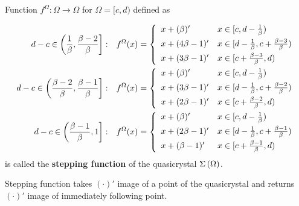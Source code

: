 \documentclass[text.tex]{subfiles}
\begin{document}
\begin{definition}
\label{def:steppingFunction}
Function $f^\Omega: \Omega \to \Omega$ for $\Omega = [c,d)$ defined as

\begin{align*}
d-c \in \left( \frac{1}{\beta}, \frac{\beta - 2}{\beta} \right]:& \quad
		f^\Omega(x) = \left\{ \begin{array}{l l}
			x + (\beta)' 	& x\in [c,d-\frac{1}{\beta})\\[1.5mm]
			x + (4\beta-1)' & x\in [d-\frac{1}{\beta},c+\frac{\beta - 3}{\beta})\\[1.5mm]
			x + (3\beta-1)' & x\in [c+\frac{\beta - 3}{\beta},d)
		\end{array} \right.
\\
d-c \in \left( \frac{\beta-2}{\beta}, \frac{\beta-1}{\beta} \right]:& \quad
		f^\Omega(x) = \left\{ \begin{array}{l l}
			x + (\beta)' 	& x\in [c,d-\frac{1}{\beta})\\[1.5mm]
			x + (3\beta-1)' & x\in [d-\frac{1}{\beta},c+\frac{\beta - 2}{\beta})\\[1.5mm]
			x + (2\beta-1)' & x\in [c+\frac{\beta - 2}{\beta},d)
		\end{array} \right.
\\
d-c \in \left( \frac{\beta-1}{\beta}, 1 \right]:& \quad
		f^\Omega(x) = \left\{ \begin{array}{l l}
			x + (\beta)' 	& x\in [c,d-\frac{1}{\beta})\\[1.5mm]
			x + (2\beta-1)' & x\in [d-\frac{1}{\beta},c+\frac{\beta - 1}{\beta})\\[1.5mm]
			x + (\beta-1)' & x\in [c+\frac{\beta - 1}{\beta},d)
		\end{array} \right.
\end{align*}
is called the \textbf{stepping function} of the quasicrystal $\Sigma\left(\Omega\right)$. 
\end{definition}

\begin{remark}
Stepping function takes $(\cdot)'$ image of a point of the quasicrystal and returns $(\cdot)'$ image of immediately following point.\\
\end{remark}
\end{document}
